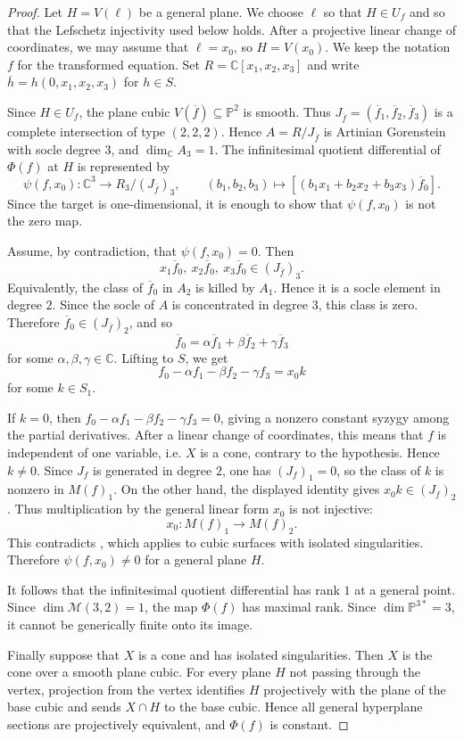 \documentclass[11pt]{amsart}
\theoremstyle{plain}
\theoremstyle{definition}
\numberwithin{equation}{section}
\newcommand{\M}{{\mathcal M}}
\newcommand{\C}{\mathbb{C}}
\newcommand{\PP}{\mathbb{P}}
\begin{document}
\begin{proof}
Let $H=V(\ell)$ be a general plane. We choose $\ell$ so that $H\in U_f$ and so
that the Lefschetz injectivity used below holds. After a projective linear
change of coordinates, we may assume that $\ell=x_0$, so $H=V(x_0)$. We keep the
notation $f$ for the transformed equation. Set $R=\C[x_1,x_2,x_3]$ and write
$\overline h=h(0,x_1,x_2,x_3)$ for $h\in S$.

Since $H\in U_f$, the plane cubic $V(\overline f)\subseteq\PP^2$ is smooth.
Thus $J_{\overline f}=(\overline f_1,\overline f_2,\overline f_3)$ is a complete
intersection of type $(2,2,2)$. Hence $A=R/J_{\overline f}$ is Artinian
Gorenstein with socle degree $3$, and $\dim_\C A_3=1$. The infinitesimal
quotient differential of $\Phi(f)$ at $H$ is represented by
\[
\psi(f,x_0):\C^3\to R_3/(J_{\overline f})_3,\qquad
(b_1,b_2,b_3)\mapsto [(b_1x_1+b_2x_2+b_3x_3)\overline f_0].
\]
Since the target is one-dimensional, it is enough to show that $\psi(f,x_0)$ is
not the zero map.

Assume, by contradiction, that $\psi(f,x_0)=0$. Then
\[
x_1\overline f_0,\ x_2\overline f_0,\ x_3\overline f_0\in (J_{\overline f})_3.
\]
Equivalently, the class of $\overline f_0$ in $A_2$ is killed by $A_1$. Hence it
is a socle element in degree $2$. Since the socle of $A$ is concentrated in
degree $3$, this class is zero. Therefore $\overline f_0\in (J_{\overline f})_2$,
and so
\[
\overline f_0=\alpha\overline f_1+\beta\overline f_2+\gamma\overline f_3
\]
for some $\alpha,\beta,\gamma\in\C$. Lifting to $S$, we get
\[
f_0-\alpha f_1-\beta f_2-\gamma f_3=x_0k
\]
for some $k\in S_1$.

If $k=0$, then $f_0-\alpha f_1-\beta f_2-\gamma f_3=0$, giving a nonzero
constant syzygy among the partial derivatives. After a linear change of
coordinates, this means that $f$ is independent of one variable, i.e. $X$ is a
cone, contrary to the hypothesis. Hence $k\neq0$. Since $J_f$ is generated in
degree $2$, one has $(J_f)_1=0$, so the class of $k$ is nonzero in $M(f)_1$. On
the other hand, the displayed identity gives $x_0k\in (J_f)_2$. Thus
multiplication by the general linear form $x_0$ is not injective:
\[
x_0:M(f)_1\to M(f)_2.
\]
This contradicts \cite[Proposition~3.1]{I}, which applies to cubic surfaces
with isolated singularities. Therefore $\psi(f,x_0)\neq0$ for a general plane
$H$.

It follows that the infinitesimal quotient differential has rank $1$ at a
general point. Since $\dim\M(3,2)=1$, the map $\Phi(f)$ has maximal rank. Since
$\dim\PP^{3*}=3$, it cannot be generically finite onto its image.

Finally suppose that $X$ is a cone and has isolated singularities. Then $X$ is
the cone over a smooth plane cubic. For every plane $H$ not passing through the
vertex, projection from the vertex identifies $H$ projectively with the plane of
the base cubic and sends $X\cap H$ to the base cubic. Hence all general
hyperplane sections are projectively equivalent, and $\Phi(f)$ is constant.
\end{proof}
\end{document}
